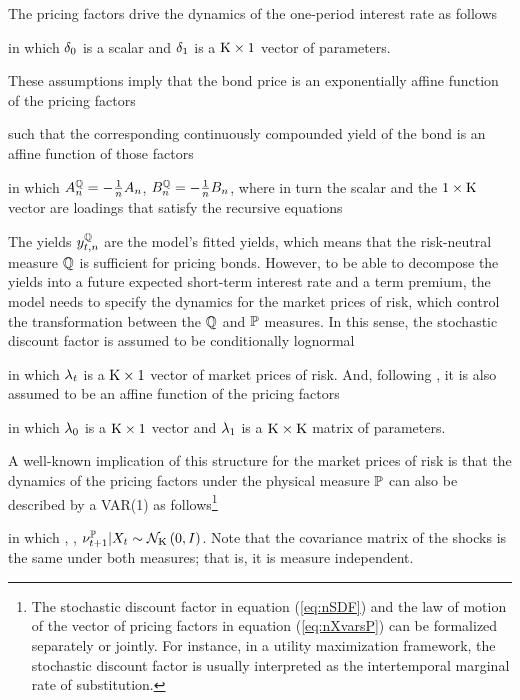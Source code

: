 {The pricing factors drive the dynamics of the one-period interest rate as follows 
	
\noindent in which \(\delta_{0}\) is a scalar and \(\delta_{1}\) is a \(\mathrm{K} \times 1\) vector of parameters.

These assumptions imply that the bond price is an exponentially affine function of the pricing factors
	
\noindent such that the corresponding continuously compounded yield of the bond is an affine function of those factors
	
\noindent in which \(A_{n}^{\mathbb{Q}} = - \frac{1}{n} A_{n}\), \(B_{n}^{\mathbb{Q}} = - \frac{1}{n} B_{n}\), where in turn the scalar  and the \(1 \times \mathrm{K}\) vector  are loadings that satisfy the recursive equations
	
	\vspace{-.7cm}
	
The yields \(y_{t,n}^{\mathbb{Q}}\) are the model's fitted yields, which means that the risk-neutral measure \(\mathbb{Q}\) is sufficient for pricing bonds. 
However, to be able to decompose the yields into a future expected short-term interest rate and a term premium, the model needs to specify the dynamics for the market prices of risk, which control the transformation between the \(\mathbb{Q}\) and \(\mathbb{P}\) measures. 
In this sense, the stochastic discount factor is assumed to be conditionally lognormal

\noindent in which \(\lambda_{t}\) is a \(\mathrm{K} \times 1\) vector of market prices of risk. And, following \cite{Duffee:2002}, it is also assumed to be an affine function of the pricing factors
	
\noindent in which \(\lambda_{0}\) is a \(\mathrm{K} \times 1\) vector and \(\lambda_{1}\) is a \(\mathrm{K} \times \mathrm{K}\) matrix of parameters.

A well-known implication of this structure for the market prices of risk is that the dynamics of the pricing factors under the physical measure \(\mathbb{P}\) can also be described by a VAR(1) as follows\footnote{ The stochastic discount factor in equation (\ref{eq:nSDF}) and the law of motion of the vector of pricing factors in equation (\ref{eq:nXvarsP}) can be formalized separately or jointly. For instance, in a utility maximization framework, the stochastic discount factor is usually interpreted as the intertemporal marginal rate of substitution.} %
	
\noindent in which , ,  \(\nu_{t+1}^{\mathbb{P}} | X_{t} \sim \mathcal{N}_{\mathrm{K}} \left(0,I\right)\). Note that the covariance matrix of the shocks is the same under both measures; that is, it is measure independent. 

}
